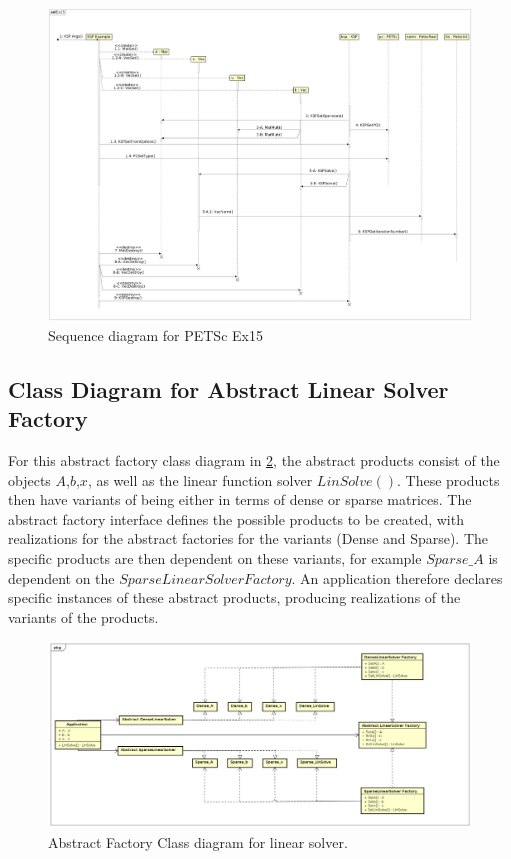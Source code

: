 \documentclass[12pt,letterpaper]{article}
\begin{document}
\begin{figure}[H]
  \centering
  \includegraphics[width=\textwidth]{figures/Petsc_ex15.pdf}
  \caption{Sequence diagram for PETSc Ex15}
  \label{fig:ex15}
\end{figure}



\subsection{Class Diagram for Abstract Linear Solver Factory}
For this abstract factory class diagram in \cref{fig:linalgfactory}, the abstract products consist of the objects $A$,$b$,$x$, as well as the linear function solver $LinSolve()$. These products then have variants of being either in terms of dense or sparse matrices. The abstract factory interface defines the possible products to be created, with realizations for the abstract factories for the variants (Dense and Sparse). The specific products are then dependent on these variants, for example $Sparse\_A$ is dependent on the $SparseLinearSolver Factory$. An application therefore declares specific instances of these abstract products, producing realizations of the variants of the products.
\begin{figure}[H]
  \centering
  \includegraphics[width=\textwidth]{figures/LinAlg.pdf}
  \caption{Abstract Factory Class diagram for linear solver.}
  \label{fig:linalgfactory}
\end{figure}
\end{document}
